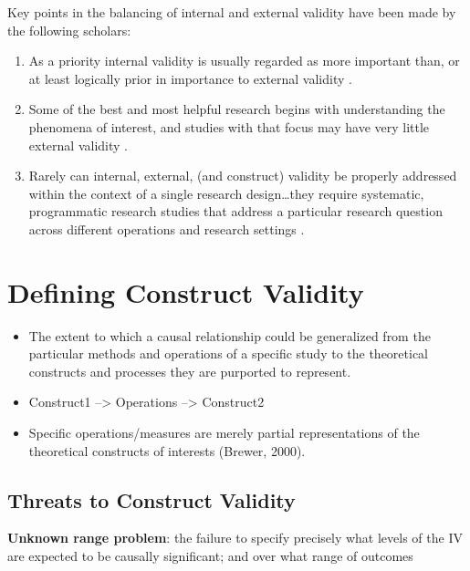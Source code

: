 \documentclass[
  english,
]{book}
\providecommand{\tightlist}{%
  \setlength{\itemsep}{0pt}\setlength{\parskip}{0pt}}
\begin{document}
Key points in the balancing of internal and external validity have been made by the following scholars:

\begin{enumerate}
\def\labelenumi{\arabic{enumi}.}
\tightlist
\item
  As a priority internal validity is usually regarded as more important than, or at least logically prior in importance to external validity \citep{kazdin_research_2017}.
\item
  Some of the best and most helpful research begins with understanding the phenomena of interest, and studies with that focus may have very little external validity \citep{mook_defense_1983}.
\item
  Rarely can internal, external, (and construct) validity be properly addressed within the context of a single research design\ldots they require systematic, programmatic research studies that address a particular research question across different operations and research settings \citep{reis_research_2000}.
\end{enumerate}

\hypertarget{defining-construct-validity}{%
\section{Defining Construct Validity}\label{defining-construct-validity}}

\begin{itemize}
\tightlist
\item
  The extent to which a causal relationship could be generalized from the particular methods and operations of a specific study to the theoretical constructs and processes they are purported to represent.
\item
  Construct1 --\textgreater{} Operations --\textgreater{} Construct2
\item
  Specific operations/measures are merely partial representations of the theoretical constructs of interests (Brewer, 2000).
\end{itemize}

\hypertarget{threats-to-construct-validity}{%
\subsection{Threats to Construct Validity}\label{threats-to-construct-validity}}

\textbf{Unknown range problem}: the failure to specify precisely what levels of the IV are expected to be causally significant; and over what range of outcomes
\end{document}
